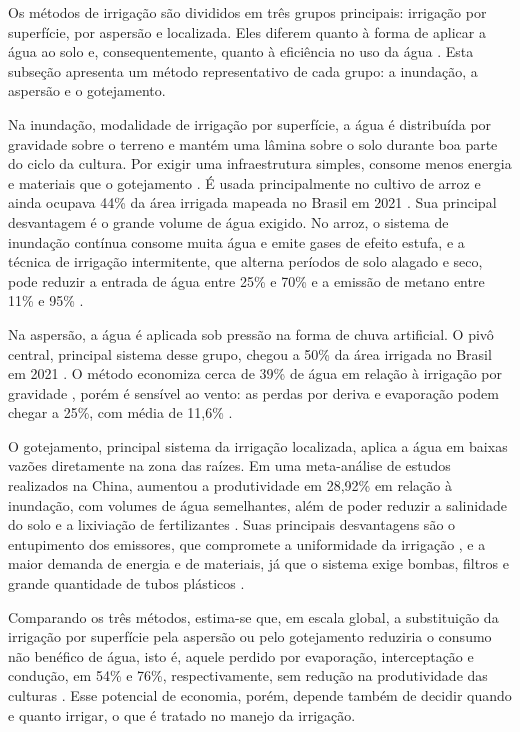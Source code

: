 Os métodos de irrigação são divididos em três grupos principais: irrigação por superfície, por aspersão e localizada. Eles diferem quanto à forma de aplicar a água ao solo e, consequentemente, quanto à eficiência no uso da água \cite{jagermeyr2015}. Esta subseção apresenta um método representativo de cada grupo: a inundação, a aspersão e o gotejamento.

Na inundação, modalidade de irrigação por superfície, a água é distribuída por gravidade sobre o terreno e mantém uma lâmina sobre o solo durante boa parte do ciclo da cultura. Por exigir uma infraestrutura simples, consome menos energia e materiais que o gotejamento \cite{vigo2026}. É usada principalmente no cultivo de arroz e ainda ocupava 44\% da área irrigada mapeada no Brasil em 2021 \cite{mapbiomas2022irrigacao}. Sua principal desvantagem é o grande volume de água exigido. No arroz, o sistema de inundação contínua consome muita água e emite gases de efeito estufa, e a técnica de irrigação intermitente, que alterna períodos de solo alagado e seco, pode reduzir a entrada de água entre 25\% e 70\% e a emissão de metano entre 11\% e 95\% \cite{ishfaq2020}.

Na aspersão, a água é aplicada sob pressão na forma de chuva artificial. O pivô central, principal sistema desse grupo, chegou a 50\% da área irrigada no Brasil em 2021 \cite{mapbiomas2022irrigacao}. O método economiza cerca de 39\% de água em relação à irrigação por gravidade \cite{chauhdary2024}, porém é sensível ao vento: as perdas por deriva e evaporação podem chegar a 25\%, com média de 11,6\% \cite{manke2019}.

O gotejamento, principal sistema da irrigação localizada, aplica a água em baixas vazões diretamente na zona das raízes. Em uma meta-análise de estudos realizados na China, aumentou a produtividade em 28,92\% em relação à inundação, com volumes de água semelhantes, além de poder reduzir a salinidade do solo e a lixiviação de fertilizantes \cite{yang2023}. Suas principais desvantagens são o entupimento dos emissores, que compromete a uniformidade da irrigação \cite{shi2022}, e a maior demanda de energia e de materiais, já que o sistema exige bombas, filtros e grande quantidade de tubos plásticos \cite{vigo2026}.

Comparando os três métodos, estima-se que, em escala global, a substituição da irrigação por superfície pela aspersão ou pelo gotejamento reduziria o consumo não benéfico de água, isto é, aquele perdido por evaporação, interceptação e condução, em 54\% e 76\%, respectivamente, sem redução na produtividade das culturas \cite{jagermeyr2015}. Esse potencial de economia, porém, depende também de decidir quando e quanto irrigar, o que é tratado no manejo da irrigação.

